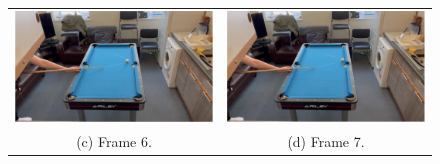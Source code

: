 \documentclass[ %
                author={Finn Alexander Wilkinson},
                supervisor={Dr. Andrew Calway},
                degree={MEng},
                title={\centering A Mixed Reality Aim Assistant for Pool and Snooker},
                subtitle={},
                type={Enterprise},
                year={2021} ]{dissertation}
\begin{document}
\begin{figure}[h!]
\begin{tabular}{cc}
         \includegraphics[scale = 0.15]{Images/Eval/Path Estimate/Rebound 2 Slow/Frame 6 - Shot 2 - Rebound 6.PNG} & \includegraphics[scale = 0.15]{Images/Eval/Path Estimate/Rebound 2 Slow/Frame 7 - Shot 2 - Rebound 7.PNG}\\ 
         (c) Frame 6. & (d) Frame 7. \\ [6pt]

\end{tabular}
\end{figure}
\end{document}
